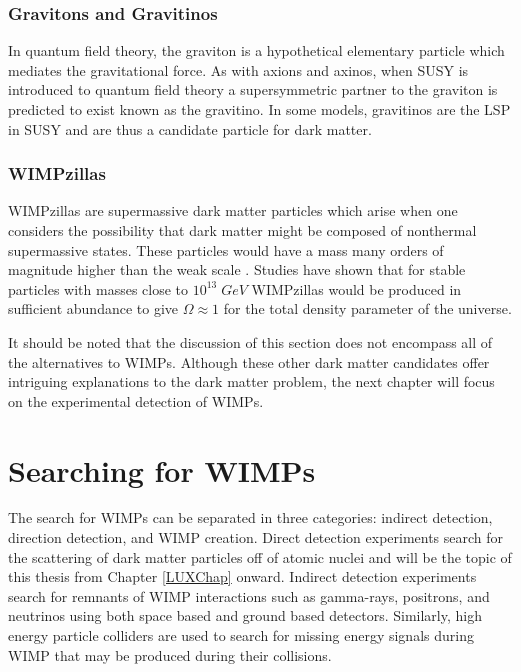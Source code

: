 \documentclass[a4paper,12pt]{article}
\begin{document}
\subsubsection{Gravitons and Gravitinos}
In quantum field theory, the graviton is a hypothetical  elementary particle which mediates the gravitational force.  As with axions and axinos, when SUSY is introduced to quantum field theory a supersymmetric partner to the graviton is predicted to exist known as the gravitino.  In some models, gravitinos are the LSP in SUSY and are thus a candidate particle for dark matter.

\subsubsection{WIMPzillas}
WIMPzillas are supermassive dark matter particles which arise when one considers the possibility that dark matter might be composed of nonthermal supermassive states. These particles would have a mass many orders of magnitude higher than the weak scale \cite{Chung}. Studies have shown that for stable particles with masses close to $10^{13} \; GeV$  WIMPzillas would be produced in sufficient abundance to give $\Omega \approx 1$ for the total density parameter of the universe.  

It should be noted that the discussion of this section does not encompass all of the alternatives to WIMPs.   Although these other dark matter candidates offer intriguing explanations to the dark matter problem, the next chapter will focus on the experimental detection of WIMPs.

\section{Searching for WIMPs} \label{Chapter2}

The search for WIMPs can be separated in three categories: indirect detection, direction detection, and WIMP creation. \cite{Bertone}  Direct detection experiments search for the scattering of dark matter particles off of atomic nuclei and will be the topic of this thesis from Chapter \ref{LUXChap} onward. Indirect detection experiments search for remnants of WIMP interactions such as gamma-rays, positrons, and neutrinos using both space based and ground based detectors.  Similarly, high energy particle colliders are used to search for missing energy signals during WIMP that may be produced during their collisions.
\end{document}
